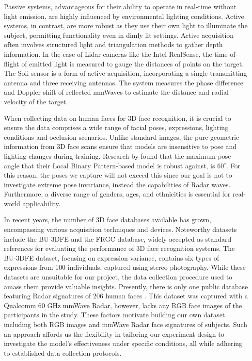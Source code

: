 \documentclass{interim}
\begin{document}
Passive systems, advantageous for their ability to operate in real-time without light emission, are highly influenced by environmental lighting conditions. Active systems, in contrast, are more robust as they use their own light to illuminate the subject, permitting functionality even in dimly lit settings. Active acquisition often involves structured light and triangulation methods to gather depth information. In the case of Lidar cameras like the Intel RealSense, the time-of-flight of emitted light is measured to gauge the distances of points on the target. The Soli sensor is a form of active acquisition, incorporating a single transmitting antenna and three receiving antennas. The system measures the phase difference and Doppler shift of reflected mmWaves to estimate the distance and radial velocity of the target. 

When collecting data on human faces for 3D face recognition, it is crucial to ensure the data comprises a wide range of facial poses, expressions, lighting conditions and occlusion scenarios. Unlike standard images, the pure geometric information from 3D face scans ensure that models are insensitive to pose and lighting changes during training. Research by \cite{prabhu2011unconstrained} found that the maximum pose angle that their Local Binary Pattern-based model is robust against, is $60^\circ$. For this reason, the poses we capture will not exceed this since our goal is not to investigate extreme pose invariance, instead the capabilities of Radar waves. Furthermore, a diverse range of genders, ages, and ethnicities is essential for real-world applicability.

In recent years, the number of 3D face databases available has grown, encompassing various acquisition techniques and devices. Noteworthy datasets include the BU-3DFE \cite{yin20063d} and the FRGC \cite{phillips2005overview} database, widely accepted as standard references for evaluating the performance of 3D face recognition systems. The BU-3DFE dataset, focusing on expression variance, contains six types of expressions from 100 individuals, captured using stereo photography. While these datasets are unsuitable for our project, the data collection procedure used to amass them provide valuable insights. Presently, there is only one public database featuring Radar signatures of 206 human faces \cite{mmwavefacedata}. This dataset was captured with a Qualcomm 60 GHz mmWave Radar, however, lacks any RGB face images of the participants in the study. These factors motivate building our own dataset including both RGB images and mmWave Radar face signatures of subjects. Such an approach affords us the flexibility in tailoring our experiment design to investigate the model's effectiveness under specific conditions, all while adhering to established data collection protocols.
\end{document}
